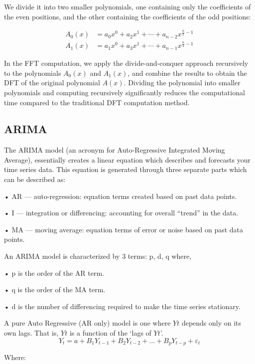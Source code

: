 \documentclass{ieeeojies}
\begin{document}
We divide it into two smaller polynomials, one containing only the coefficients of the even positions, and the other containing the coefficients of the odd positions:

\begin{align*}
A_0(x) &= a_0x^0 + a_2x^1 + \cdots + a_{n-2}x^{\frac{n}{2}-1}\\
A_1(x) &= a_1x^0 + a_3x^1 + \cdots + a_{n-1}x^{\frac{n}{2}-1}
\end{align*}

In the FFT computation, we apply the divide-and-conquer approach recursively to the polynomials $A_0(x)$ and $A_1(x)$, and combine the results to obtain the DFT of the original polynomial $A(x)$. Dividing the polynomial into smaller polynomials and computing recursively significantly reduces the computational time compared to the traditional DFT computation method.

\subsection{ARIMA }
The ARIMA model (an acronym for Auto-Regressive Integrated Moving Average), essentially creates a linear equation which describes and forecasts your time series data. This equation is generated through three separate parts which can be described as:

•	AR — auto-regression: equation terms created based on past data points.

•	I — integration or differencing: accounting for overall “trend” in the data.

•	MA — moving average: equation terms of error or noise based on past data points.

An ARIMA model is characterized by 3 terms: p, d, q
where,

•	p is the order of the AR term.

•	q is the order of the MA term.

•	d is the number of differencing required to make the time series stationary.

A pure Auto Regressive (AR only) model is one where $Yt$ depends only on its own lags. That is, $Yt$ is a function of the ‘lags of $Yt$’.
\begin{equation*}
 Y_t = a + B_1 Y_{t-1} + B_2 Y_{t-2} + \ldots + B_p Y_{t-p} + \varepsilon_t
\end{equation*}

Where:
\end{document}
